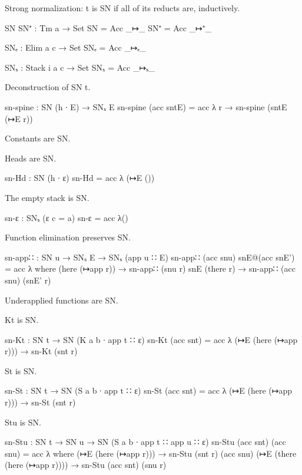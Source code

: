 Strong normalization: t is SN if all of its reducts are, inductively.

\begin{code}
SN SN⁺ : Tm a → Set
SN   = Acc _↦_
SN⁺  = Acc _↦⁺_

SNₑ : Elim a c → Set
SNₑ = Acc _↦ₑ_

SNₛ : Stack i a c → Set
SNₛ = Acc _↦ₛ_
\end{code}

Deconstruction of SN t.

\begin{code}
sn-spine : SN (h ∙ E) → SNₛ E
sn-spine (acc sntE) = acc λ r → sn-spine (sntE (↦E r))
\end{code}

Constants are SN.

Heads are SN.

\begin{code}
sn-Hd : SN (h ∙ ε)
sn-Hd = acc λ{ (↦E ()) }
\end{code}

The empty stack is SN.

\begin{code}
sn-ε : SNₛ (ε {c = a})
sn-ε = acc λ()
\end{code}

Function elimination preserves SN.

\begin{code}
sn-app∷ : SN u → SNₛ E → SNₛ (app u ∷ E)
sn-app∷ (acc snu) snE@(acc snE') = acc λ where
   (here (↦app r))  → sn-app∷ (snu r)    snE
   (there r)        → sn-app∷ (acc snu)  (snE' r)
\end{code}

Underapplied functions are SN.

Kt is SN.

\begin{code}
sn-Kt : SN t → SN (K {a} {b} ∙ app t ∷ ε)
sn-Kt (acc snt) = acc λ{ (↦E (here (↦app r))) → sn-Kt (snt r) }
\end{code}

St is SN.

\begin{code}
sn-St : SN t → SN (S {a} {b} ∙ app t ∷ ε)
sn-St (acc snt) = acc λ{ (↦E (here (↦app r))) → sn-St (snt r) }
\end{code}

Stu is SN.

\begin{code}
sn-Stu : SN t → SN u → SN (S {a} {b} ∙ app t ∷ app u ∷ ε)
sn-Stu (acc snt) (acc snu) = acc λ where
   (↦E (here (↦app r)))          → sn-Stu (snt r)    (acc snu)
   (↦E (there (here (↦app r))))  → sn-Stu (acc snt)  (snu r)
\end{code}

